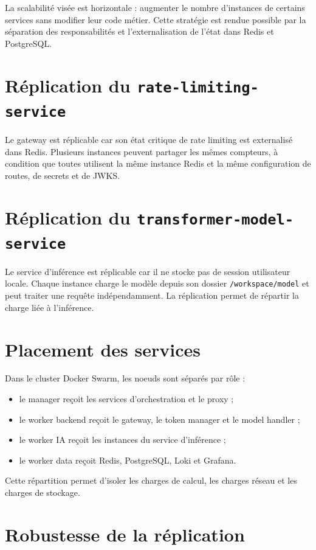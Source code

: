 ﻿\documentclass[12pt, a4paper]{report}
\begin{document}
La scalabilité visée est horizontale : augmenter le nombre d'instances de
certains services sans modifier leur code métier. Cette stratégie est rendue
possible par la séparation des responsabilités et l'externalisation de l'état
dans Redis et PostgreSQL.

\section{Réplication du \texttt{rate-limiting-service}}

Le gateway est réplicable car son état critique de rate limiting est externalisé
dans Redis. Plusieurs instances peuvent partager les mêmes compteurs, à
condition que toutes utilisent la même instance Redis et la même configuration de
routes, de secrets et de JWKS.

\section{Réplication du \texttt{transformer-model-service}}

Le service d'inférence est réplicable car il ne stocke pas de session utilisateur
locale. Chaque instance charge le modèle depuis son dossier
\texttt{/workspace/model} et peut traiter une requête indépendamment. La
réplication permet de répartir la charge liée à l'inférence.

\section{Placement des services}

Dans le cluster Docker Swarm, les noeuds sont séparés par rôle :

\begin{itemize}
  \item le manager reçoit les services d'orchestration et le proxy ;
  \item le worker backend reçoit le gateway, le token manager et le model handler ;
  \item le worker IA reçoit les instances du service d'inférence ;
  \item le worker data reçoit Redis, PostgreSQL, Loki et Grafana.
\end{itemize}

Cette répartition permet d'isoler les charges de calcul, les charges réseau et
les charges de stockage.

\section{Robustesse de la réplication}
\end{document}
